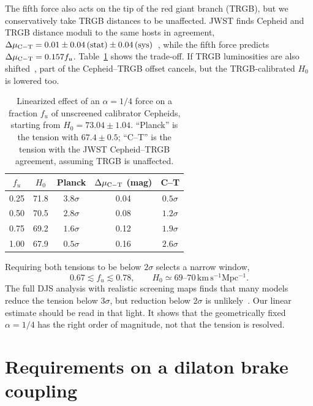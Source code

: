 \documentclass[aps,prd,reprint,superscriptaddress,nofootinbib,floatfix]{revtex4-2}
\theoremstyle{definition}
\begin{document}
The fifth force also acts on the tip of the red giant branch (TRGB), but we conservatively take TRGB distances to be unaffected. JWST finds Cepheid and TRGB distance moduli to the same hosts in agreement, $\Delta\mu_{\rm C-T}=0.01\pm0.04\,(\mathrm{stat})\pm0.04\,(\mathrm{sys})$~\cite{Riess2024}, while the fifth force predicts $\Delta\mu_{\rm C-T}=0.157f_u$. Table~\ref{tab:ladder} shows the trade-off. If TRGB luminosities are also shifted~\cite{DesmondSakstein2020}, part of the Cepheid--TRGB offset cancels, but the TRGB-calibrated $H_0$ is lowered too.

\begin{table}[t]
\caption{Linearized effect of an $\alpha=1/4$ force on a fraction $f_u$ of unscreened calibrator Cepheids, starting from $H_0=73.04\pm1.04$. ``Planck'' is the tension with $67.4\pm0.5$; ``C--T'' is the tension with the JWST Cepheid--TRGB agreement, assuming TRGB is unaffected.}
\label{tab:ladder}
\begin{ruledtabular}
\begin{tabular}{ccccc}
$f_u$ & $H_0$ & Planck & $\Delta\mu_{\rm C-T}$ (mag) & C--T \\
\hline
0.25 & 71.8 & $3.8\sigma$ & 0.04 & $0.5\sigma$\\
0.50 & 70.5 & $2.8\sigma$ & 0.08 & $1.2\sigma$\\
0.75 & 69.2 & $1.6\sigma$ & 0.12 & $1.9\sigma$\\
1.00 & 67.9 & $0.5\sigma$ & 0.16 & $2.6\sigma$\\
\end{tabular}
\end{ruledtabular}
\end{table}

Requiring both tensions to be below $2\sigma$ selects a narrow window,
\begin{equation}
0.67\lesssim f_u\lesssim0.78,\qquad H_0\simeq 69\text{--}70\,\mathrm{km\,s^{-1}Mpc^{-1}}. \label{eq:window}
\end{equation}
The full DJS analysis with realistic screening maps finds that many models reduce the tension below $3\sigma$, but reduction below $2\sigma$ is unlikely~\cite{DJS2019}. Our linear estimate should be read in that light. It shows that the geometrically fixed $\alpha=1/4$ has the right order of magnitude, not that the tension is resolved.

\section{Requirements on a dilaton brake coupling}\label{sec:brake}
\end{document}
